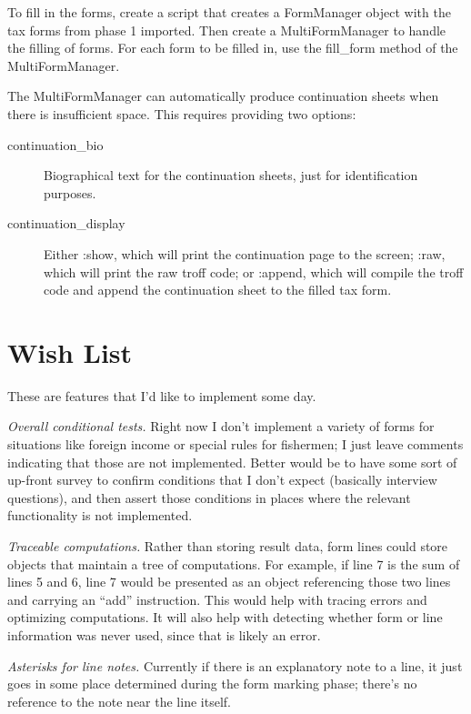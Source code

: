 \documentclass[12pt]{article}
\begin{document}
To fill in the forms, create a script that creates a FormManager object with the
tax forms from phase 1 imported. Then create a MultiFormManager to handle the
filling of forms. For each form to be filled in, use the fill\_form method of
the MultiFormManager.

The MultiFormManager can automatically produce continuation sheets when there is
insufficient space. This requires providing two options:
\begin{description}
\item[continuation\_bio] Biographical text for the continuation sheets, just for
identification purposes.
\item[continuation\_display] Either :show, which will print the continuation
page to the screen; :raw, which will print the raw troff code; or :append, which
will compile the troff code and append the continuation sheet to the filled tax
form.
\end{description}





\section{Wish List}

These are features that I'd like to implement some day.

\emph{Overall conditional tests.} Right now I don't implement a variety of forms
for situations like foreign income or special rules for fishermen; I just leave
comments indicating that those are not implemented. Better would be to have some
sort of up-front survey to confirm conditions that I don't expect (basically
interview questions), and then assert those conditions in places where the
relevant functionality is not implemented.

\emph{Traceable computations.} Rather than storing result data, form lines could
store objects that maintain a tree of computations. For example, if line 7 is
the sum of lines 5 and 6, line 7 would be presented as an object referencing
those two lines and carrying an ``add'' instruction. This would help with
tracing errors and optimizing computations. It will also help with detecting
whether form or line information was never used, since that is likely an error.

\emph{Asterisks for line notes.} Currently if there is an explanatory note to a
line, it just goes in some place determined during the form marking phase;
there's no reference to the note near the line itself.
\end{document}

